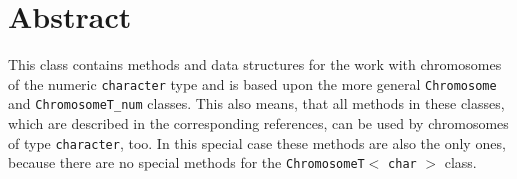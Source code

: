 \section{Abstract}

This class contains methods and data structures for the work
with chromosomes of the numeric {\tt character} type and
is based upon the more general {\tt Chromosome} and {\tt ChromosomeT\_num}
classes.
This also means, that all methods in these classes, which are
described in the corresponding references, can be used by
chromosomes of type {\tt character}, too.
In this special case these methods are also the only ones, because there
are no special methods for the {\tt ChromosomeT}$<$ {\tt char} $>$ class.
